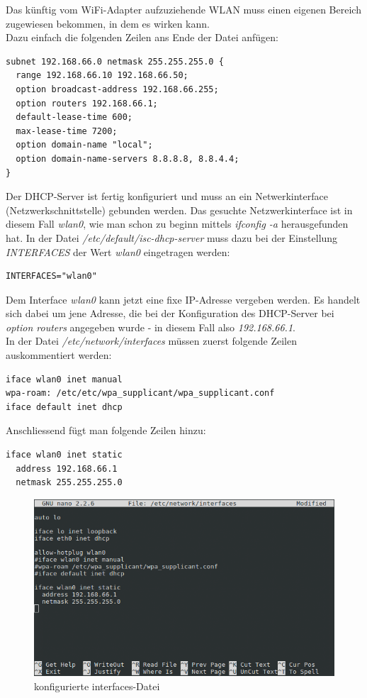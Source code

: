 Das künftig vom WiFi-Adapter aufzuziehende WLAN muss einen eigenen Bereich zugewiesen bekommen, in dem es wirken kann.
\\
Dazu einfach die folgenden Zeilen ans Ende der Datei anfügen:

\begin{lstlisting}
subnet 192.168.66.0 netmask 255.255.255.0 {
  range 192.168.66.10 192.168.66.50;
  option broadcast-address 192.168.66.255;
  option routers 192.168.66.1;
  default-lease-time 600;
  max-lease-time 7200;
  option domain-name "local";
  option domain-name-servers 8.8.8.8, 8.8.4.4;
}
\end{lstlisting}

Der DHCP-Server ist fertig konfiguriert und muss an ein Netwerkinterface (Netzwerkschnittstelle) gebunden werden. Das gesuchte Netzwerkinterface ist in diesem Fall \textit{wlan0}, wie man schon zu beginn mittels \textit{ifconfig -a} herausgefunden hat.
In der Datei \textit{/etc/default/isc-dhcp-server} muss dazu bei der Einstellung \textit{INTERFACES} der Wert \textit{wlan0} eingetragen werden:

\begin{lstlisting}
INTERFACES="wlan0"
\end{lstlisting}

Dem Interface \textit{wlan0} kann jetzt eine fixe IP-Adresse vergeben werden. Es handelt sich dabei um jene Adresse, die bei der Konfiguration des DHCP-Server bei \textit{option routers} angegeben wurde - in diesem Fall also \textit{192.168.66.1}. 
\\
In der Datei \textit{/etc/network/interfaces} müssen zuerst folgende Zeilen auskommentiert werden:

\begin{lstlisting}
iface wlan0 inet manual
wpa-roam: /etc/etc/wpa_supplicant/wpa_supplicant.conf
iface default inet dhcp
\end{lstlisting}

Anschliessend fügt man folgende Zeilen hinzu:

\begin{lstlisting}
iface wlan0 inet static
  address 192.168.66.1
  netmask 255.255.255.0
\end{lstlisting}

\begin{figure}[h]
\centering
\includegraphics[scale=0.7]{images/network_interfaces}
\caption{konfigurierte interfaces-Datei}
\end{figure}

